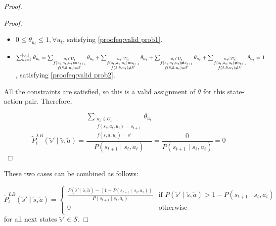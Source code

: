 \begin{proof}
\begin{proof}
\begin{itemize}
    \item $0 \leq \theta_{u_t} \leq 1, \forall u_t$, satisfying \eqref{proofeq:valid prob1}.
    
    \item $\sum_{u_t = 1}^{|U_t|} \theta_{u_t} = \sum_{\substack{u_t \in U_t \\f(s_t, a_t, u_t) = s_{t+1} \\ f(\tilde{s}, \tilde{a}, u_t) = \tilde{s}'}} \theta_{u_t} + \sum_{\substack{u_t \in U_t \\f(s_t, a_t, u_t) = s_{t+1} \\ f(\tilde{s}, \tilde{a}, u_t) \neq \tilde{s}'}} \theta_{u_t} + \sum_{\substack{u_t \in U_t \\f(s_t, a_t, u_t) \neq s_{t+1} \\ f(\tilde{s}, \tilde{a}, u_t) = \tilde{s}'}} \theta_{u_t} \\+ \sum_{\substack{u_t \in U_t \\f(s_t, a_t, u_t) \neq s_{t+1} \\ f(\tilde{s}, \tilde{a}, u_t) \neq \tilde{s}'}} \theta_{u_t} = 1$, satisfying \eqref{proofeq:valid prob2}.
\end{itemize}

All the constraints are satisfied, so this is a valid assignment of $\theta$ for this state-action pair. Therefore,

\[\tilde{P}_{t}^{LB}(\tilde{s}' \mid \tilde{s}, \tilde{a}) = \dfrac{\sum_{\substack{u_t \in U_t \\f(s_t, a_t, u_t) = s_{t+1} \\ f(\tilde{s}, \tilde{a}, u_t) = \tilde{s}'}} \theta_{u_t}}{P(s_{t+1} \mid s_t, a_t)}= \frac{0}{P(s_{t+1} \mid s_t, a_t)} =0\]

\end{proof}
These two cases can be combined as follows:

\[\tilde{P}_{t}^{LB}(\tilde{s}' \mid \tilde{s}, \tilde{a}) = 
\begin{cases}
\frac{P(\tilde{s}' \mid \tilde{s}, \tilde{a}) - (1 - P(s_{t+1} \mid s_t, a_t))}{P(s_{t+1} \mid s_t, a_t)} & \text{if $P(\tilde{s}' \mid \tilde{s}, \tilde{a}) > 1 - P(s_{t+1} \mid s_t, a_t)$}\\
0 & \text{otherwise}\\
\end{cases}
\]
for all next states $\tilde{s}' \in \mathcal{S}$.
\end{proof}